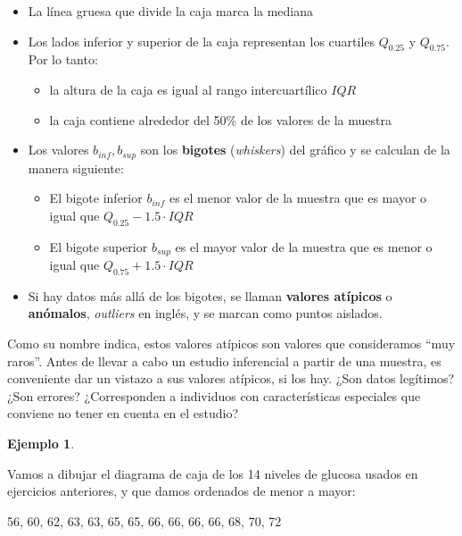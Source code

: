 \documentclass[
]{book}
\providecommand{\tightlist}{%
  \setlength{\itemsep}{0pt}\setlength{\parskip}{0pt}}
\theoremstyle{definition}
\theoremstyle{definition}
\newtheorem{example}{Ejemplo}[chapter]
\theoremstyle{definition}
\theoremstyle{definition}
\theoremstyle{remark}
\begin{document}
\begin{itemize}
\item
  La línea gruesa que divide la caja marca la mediana
\item
  Los lados inferior y superior de la caja representan los cuartiles \(Q_{0.25}\) y \(Q_{0.75}\). Por lo tanto:

  \begin{itemize}
  \tightlist
  \item
    la altura de la caja es igual al rango intercuartílico \(\mathit{IQR}\)
  \item
    la caja contiene alrededor del 50\% de los valores de la muestra
  \end{itemize}
\item
  Los valores \(b_{inf}, b_{sup}\) son los \textbf{bigotes} (\emph{whiskers}) del gráfico y se calculan de la manera siguiente:

  \begin{itemize}
  \item
    El bigote inferior \(b_{inf}\) es el menor valor de la muestra que es mayor o igual que \(Q_{0.25}- 1.5\cdot \mathit{IQR}\)
  \item
    El bigote superior \(b_{sup}\) es el mayor valor de la muestra que es menor o igual que \(Q_{0.75}+1.5\cdot\mathit{IQR}\)
  \end{itemize}
\item
  Si hay datos más allá de los bigotes, se llaman \textbf{valores atípicos} o \textbf{anómalos}, \emph{outliers} en inglés, y se marcan como puntos aislados.
\end{itemize}

\begin{rmdnote}
Como su nombre indica, estos valores atípicos son valores que consideramos ``muy raros''. Antes de llevar a cabo un estudio inferencial a partir de una muestra, es conveniente dar un vistazo a sus valores atípicos, si los hay. ¿Son datos legítimos? ¿Son errores? ¿Corresponden a individuos con características especiales que conviene no tener en cuenta en el estudio?
\end{rmdnote}

\begin{example}
\protect\hypertarget{exm:glucosabp}{}\label{exm:glucosabp}

Vamos a dibujar el diagrama de caja de los 14 niveles de glucosa usados en ejercicios anteriores, y que damos ordenados de menor a mayor:

56, 60, 62, 63, 63, 65, 65, 66, 66, 66, 66, 68, 70, 72

\end{example}
\end{document}
